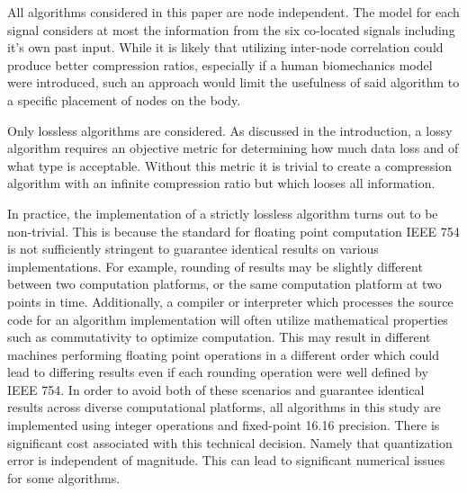 \documentclass[journal]{IEEEtran}
\begin{document}
All algorithms considered in this paper are node independent. The model for each signal considers at most the information from the six co-located signals including it's own past input. While it is likely that utilizing inter-node correlation could produce better compression ratios, especially if a human biomechanics model were introduced, such an approach would limit the usefulness of said algorithm to a specific placement of nodes on the body.

Only lossless algorithms are considered. As discussed in the introduction, a lossy algorithm requires an objective metric for determining how much data loss and of what type is acceptable. Without this metric it is trivial to create a compression algorithm with an infinite compression ratio but which looses all information.

In practice, the implementation of a strictly lossless algorithm turns out to be non-trivial. This is because the standard for floating point computation IEEE 754 \cite{Society2008} is not sufficiently stringent to guarantee identical results on various implementations. For example, rounding of results may be slightly different between two computation platforms, or the same computation platform at two points in time. Additionally, a compiler or interpreter which processes the source code for an algorithm implementation will often utilize mathematical properties such as commutativity to optimize computation. This may result in different machines performing floating point operations in a different order which could lead to differing results even if each rounding operation were well defined by IEEE 754. In order to avoid both of these scenarios and guarantee identical results across diverse computational platforms, all algorithms in this study are implemented using integer operations and fixed-point 16.16 precision. There is significant cost associated with this technical decision. Namely that quantization error is independent of magnitude. This can lead to significant numerical issues for some algorithms.
\end{document}
